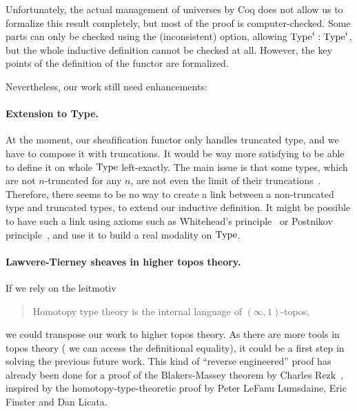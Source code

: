Unfortunately, the actual management of universes by Coq does not
allow us to formalize this result completely, but most of the proof is
computer-checked.
Some parts can only be checked using the (inconsistent)
 option, allowing $\operatorname{Type}^i : \operatorname{Type}^i$, but the
whole inductive definition cannot be checked at all. However, the key
points of the definition of the functor are formalized.

Nevertheless, our work still need enhancements:
\paragraph*{Extension to Type.}
At the moment, our sheafification functor only handles truncated type,
and we have to compose it with truncations. It would be way more
satisfying to be able to define it on whole $\operatorname{Type}$ left-exactly. The
main issue is that some types, which are not $n$-truncated for any
$n$, are not even the limit of their
truncations~\cite{morelvv}. Therefore, there seems to be no way to
create a link between a non-truncated type and truncated types, to
extend our inductive definition.
It might be possible to have such a link using axioms such as
Whitehead's principle~\cite[Section 8.8]{hottbook} or Postnikov
principle~\cite[Section 5.5.6]{lurie}, and use it to build a real
modality on $\operatorname{Type}$.

\paragraph*{Lawvere-Tierney sheaves in higher topos theory.}
If we rely on the leitmotiv
\begin{quote}
  Homotopy type theory is the internal language of $(\infty,1)$-topos,
\end{quote}
we could transpose our work to higher topos theory. As there are more
tools in topos theory (\eg{} we can access the definitional equality),
it could be a first step in solving the previous future work.
This kind of ``reverse engineered'' proof has already been done for a
proof of the Blakers-Massey theorem by Charles Rezk~\cite{rezk-BM},
inspired by the homotopy-type-theoretic proof by Peter LeFanu
Lumsdaine, Eric Finster and Dan Licata.

